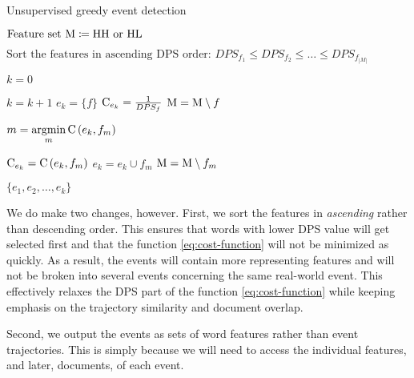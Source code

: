 \begin{algorithm}[H]
\begin{algorithmic}[1]
\caption{Unsupervised greedy event detection}
\Input $\text{Feature set} ~ \text{M} \coloneqq \text{HH or HL}$

\State $\text{Sort the features in ascending DPS order: } DPS_{f_{1}} \leq DPS_{f_{2}} \leq \dots \leq DPS_{f_{\left\vert M \right\vert}}$

\State $k = 0$

	\State $k = k + 1$	
	\State $e_{k} = \{ f \}$
	\State $\text{C}_{e_{k}} = \frac{1}{DPS_{f}}$
	\State $\text{M} = \text{M} \setminus f$
	
		\State $m = \operatorname*{argmin}\limits_{m}{\text{C} \left( e_{k}, f_{m} \right)}$

			\State $\text{C}_{e_{k}} = \text{C} \left( e_{k}, f_{m} \right)$
			\State $e_{k} = e_{k} \cup f_{m}$
			\State $\text{M} = \text{M} \setminus f_{m}$
		\Else
			\Break
		\EndIf
	\EndWhile
\EndFor

\Output $\{ e_{1}, e_{2}, \dots, e_{k} \}$
\end{algorithmic}
\end{algorithm}

We do make two changes, however. First, we sort the features in \textit{ascending} rather than descending order. This ensures that words with lower DPS value will get selected first and that the function \ref{eq:cost-function} will not be minimized as quickly. As a result, the events will contain more representing features and will not be broken into several events concerning the same real-world event. This effectively relaxes the DPS part of the function \ref{eq:cost-function} while keeping emphasis on the trajectory similarity and document overlap.

Second, we output the events as sets of word features rather than event trajectories. This is simply because we will need to access the individual features, and later, documents, of each event.